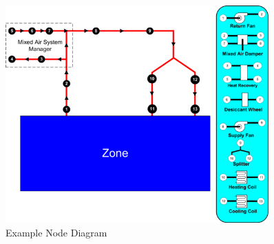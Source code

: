 \begin{figure}[hbtp]
\centering
\includegraphics[width=0.9\textwidth, height=0.9\textheight, keepaspectratio=true]{media/NodeDiagram.png}
\caption{Example Node Diagram}
\end{figure}

